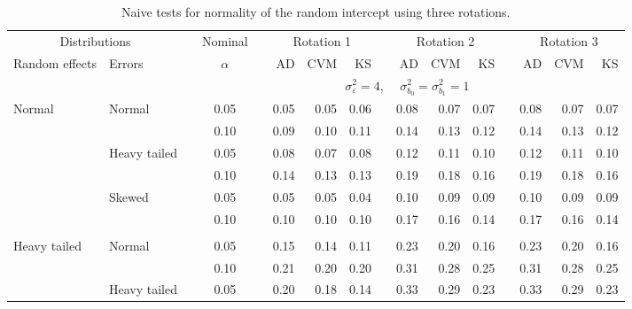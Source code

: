 \documentclass{article} %
\begin{document}

\begin{table}[ht]
\caption{Naive tests for normality of the random intercept using three rotations.}
\begin{scriptsize}
\begin{center}
\begin{tabular}{ll p{.1cm} c p{.1cm} rrr p{.1cm} rrr p{.1cm} rrr}
  \hline
  \multicolumn{2}{c}{Distributions}& & Nominal & &  \multicolumn{3}{c}{Rotation 1} & & \multicolumn{3}{c}{Rotation 2} & & \multicolumn{3}{c}{Rotation 3}\\ \cline{1-2} \cline{6-8} \cline{10-12} \cline{14-16}
  Random effects & Errors & & $\alpha$ & & AD & CVM & KS & & AD & CVM & KS & & AD & CVM & KS \\ 
   \hline
& && && \multicolumn{9}{c}{$\sigma_{\varepsilon}^2 = 4$, \ \ $\sigma_{b_0}^2 = \sigma_{b_1}^2 = 1$} \\ \cline{6-16}
\rowcolor{gray!20}Normal       & Normal       && 0.05 &&   0.05 & 0.05 & 0.06 && 0.08 & 0.07 & 0.07 && 0.08 & 0.07 & 0.07 \\ 
\rowcolor{gray!20}             &              && 0.10 &&   0.09 & 0.10 & 0.11 && 0.14 & 0.13 & 0.12 && 0.14 & 0.13 & 0.12 \\ 
\rowcolor{gray!20}             & Heavy tailed && 0.05 &&   0.08 & 0.07 & 0.08 && 0.12 & 0.11 & 0.10 && 0.12 & 0.11 & 0.10 \\ 
\rowcolor{gray!20}             &              && 0.10 &&   0.14 & 0.13 & 0.13 && 0.19 & 0.18 & 0.16 && 0.19 & 0.18 & 0.16 \\ 
\rowcolor{gray!20}             & Skewed       && 0.05 &&   0.05 & 0.05 & 0.04 && 0.10 & 0.09 & 0.09 && 0.10 & 0.09 & 0.09 \\ 
\rowcolor{gray!20}             &              && 0.10 &&   0.10 & 0.10 & 0.10 && 0.17 & 0.16 & 0.14 && 0.17 & 0.16 & 0.14 \\ 
             &&&&&&&&&&&&&&&\\
Heavy tailed & Normal       && 0.05 &&   0.15 & 0.14 & 0.11 && 0.23 & 0.20 & 0.16 && 0.23 & 0.20 & 0.16 \\ 
             &              && 0.10 &&   0.21 & 0.20 & 0.20 && 0.31 & 0.28 & 0.25 && 0.31 & 0.28 & 0.25 \\ 
             & Heavy tailed && 0.05 &&   0.20 & 0.18 & 0.14 && 0.33 & 0.29 & 0.23 && 0.33 & 0.29 & 0.23 \\ 

\end{tabular}
\end{center}
\end{scriptsize}
\end{table}
\end{document}
